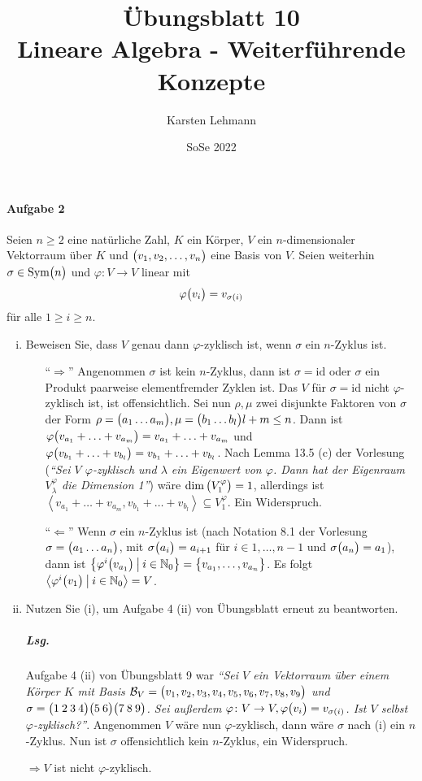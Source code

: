 \documentclass{scrreprt}
\author{Karsten Lehmann}
\date{SoSe 2022}
\title{Übungsblatt 10\\Lineare Algebra - Weiterführende Konzepte}
\newcommand\id{\text{id}}
\newcommand\Sym{\text{Sym}}
\begin{document}
\paragraph{Aufgabe 2} Seien $n \geq 2$ eine natürliche Zahl, $K$ ein Körper,
$V$ ein $n$-dimensionaler Vektorraum über $K$ und
$\qty\big(v_1, v_2, \ldots, v_n)$ eine Basis von $V$.
Seien weiterhin $\sigma \in \Sym\qty\big(n)$ und
$\varphi \colon V \to V$ linear mit
\[
  \varphi\qty\big(v_i) = v_{\sigma(i)}
\]
für alle $1 \geq i \geq n$.
\begin{enumerate}[(i)]
\item Beweisen Sie, dass $V$ genau dann $\varphi$-zyklisch ist, wenn
  $\sigma$ ein $n$-Zyklus ist.
  \begin{itemize}
  \item[``$\Rightarrow$''] Angenommen $\sigma$ ist kein $n$-Zyklus, dann ist
    $\sigma = \id$ oder $\sigma$ ein Produkt paarweise elementfremder Zyklen ist.
    Das $V$ für $\sigma = \id$ nicht $\varphi$-zyklisch ist, ist offensichtlich.
    Sei nun $\rho, \mu$ zwei disjunkte Faktoren von $\sigma$ der Form
    $\rho = \qty\big(a_1\ldots a_m), \mu = \qty\big(b_1\ldots b_l) l + m \leq n$.
    Dann ist
    $\varphi\qty\big(v_{a_1} + \ldots + v_{a_m}) = v_{a_1} + \ldots + v_{a_m}$ und
    $\varphi\qty\big(v_{b_1} + \ldots + v_{b_l}) = v_{b_1} + \ldots + v_{b_l}$.
    Nach Lemma 13.5 (c) der Vorlesung (\emph{``Sei $V$ $\varphi$-zyklisch und
      $\lambda$ ein Eigenwert von $\varphi$.
      Dann hat der Eigenraum $V_{\lambda}^{\varphi}$ die Dimension 1''}) wäre
    $\dim\qty\big(V_{1}^{\varphi}) = 1$, allerdings ist $\left\langle
      v_{a_1} + \ldots + v_{a_m}, v_{b_1} + \ldots + v_{b_l}
    \right\rangle \subseteq V_{1}^{\varphi}$.
    Ein Widerspruch.
  \item[``$\Leftarrow$''] Wenn $\sigma$ ein $n$-Zyklus ist (nach Notation 8.1
    der Vorlesung $\sigma = \qty\big(a_1\ldots a_n)$, mit
    $\sigma\qty\big(a_i) = a_{i + 1}$ für $i \in 1, \ldots, n - 1$ und
    $\sigma\qty\big(a_n) = a_1$), dann ist
    $\qty\big{\varphi^i\qty\big(v_{a_1}) \:\big|\: i \in \mathbb{N}_0} =
    \qty\big{v_{a_1}, \ldots, v_{a_n}}$.
    Es folgt $\left\langle
      \varphi^i\qty\big(v_1) \:\big|\: i \in \mathbb{N}_0
    \right\rangle = V$.
  \end{itemize}

\item Nutzen Sie (i), um Aufgabe 4 (ii) von Übungsblatt erneut zu beantworten.

  \subparagraph{Lsg.} Aufgabe 4 (ii) von Übungsblatt 9 war \emph{``Sei $V$ ein
    Vektorraum über einem Körper $K$ mit Basis $\mathcal{B}_V = \qty\big(
      v_1, v_2, v_3, v_4, v_5, v_6, v_7, v_8, v_9
    )$ und $\sigma = \qty\big(1\:2\:3\:4)\qty\big(5\:6)\qty\big(7\:8\:9)$.
    Sei außerdem $\varphi \colon V \to V, \varphi\qty\big(v_i) = v_{\sigma(i)}$.
    Ist $V$ selbst $\varphi$-zyklisch?''}.
  Angenommen $V$ wäre nun $\varphi$-zyklisch, dann wäre $\sigma$ nach (i) ein
  $n$-Zyklus.
  Nun ist $\sigma$ offensichtlich kein $n$-Zyklus, ein Widerspruch.

  $\Rightarrow V$ ist nicht $\varphi$-zyklisch.
\end{enumerate}
\end{document}
